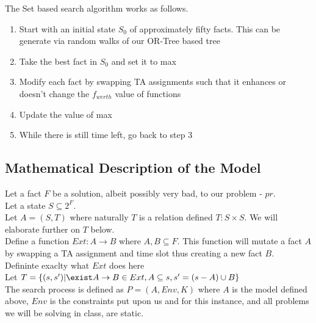 \documentclass{article}
\begin{document}
The Set based search algorithm works as follows.

\begin{enumerate}

\item Start with an initial state $S_0$ of approximately fifty facts.
  This can be generate via random walks of our OR-Tree based tree

\item Take the best fact in $S_0$ and set it to max

\item Modify each fact by swapping TA assignments such that it
  enhances or doesn't change the $f_{werth}$ value of functions

\item Update the value of max

\item While there is still time left, go back to step 3


\end{enumerate}

\subsection{Mathematical Description of the Model}


Let a fact $F$ be a solution, albeit possibly very bad, to our problem
- $pr$.\\

Let a state $S \subseteq 2^F$.\\

Let $A = (S, T)$ where naturally $T$ is a relation defined $T: S
\times S$. We will elaborate further on $T$ below.\\

Define a function $Ext: A \rightarrow B$ where $A,B \subseteq F$. This
function will mutate a fact $A$ by swapping a TA assignment and time
slot thus creating a new fact $B$.\\

Defininte exaclty what $Ext$ does here\\

Let $T = \{(s,s') | \exist A \rightarrow B \in Ext , A \subseteq s ,
s' = (s - A) \cup B\}$\\

The search process is defined as $P = (A, Env, K)$ where $A$ is the
model defined above, $Env$ is the constraints put upon us and for this
instance, and all problems we will be solving in class, are static.\\
\end{document}

